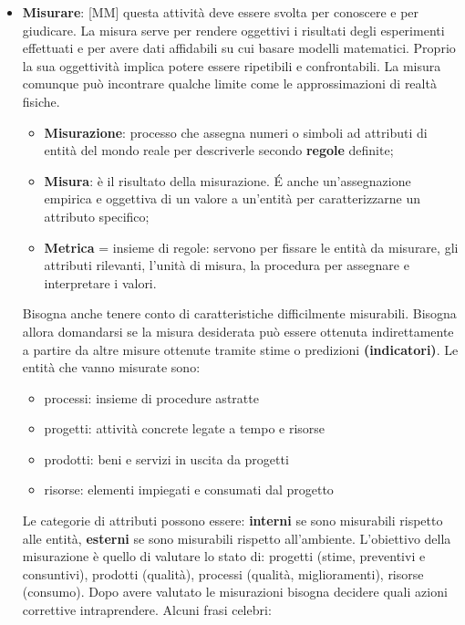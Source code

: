 \begin{itemize}
	\item \textbf{Misurare}: [MM] questa attività deve essere svolta per conoscere e per giudicare. La misura serve per rendere oggettivi i risultati degli esperimenti effettuati e per avere dati affidabili su cui basare modelli matematici. Proprio la sua oggettività implica potere essere ripetibili e confrontabili. La misura comunque può incontrare qualche limite come le approssimazioni di realtà fisiche.
		\begin{itemize}
			\item \textbf{Misurazione}: processo che assegna numeri o simboli ad attributi di entità del mondo reale per descriverle secondo \textbf{regole} definite;
			\item \textbf{Misura}: è il risultato della misurazione. \'E anche un'assegnazione empirica e oggettiva di un valore a un'entità per caratterizzarne un attributo specifico;
			\item \textbf{Metrica} = insieme di regole: servono per fissare le entità da misurare, gli attributi rilevanti, l'unità di misura, la procedura per assegnare e interpretare i valori.
		\end{itemize}
		\noindent
		Bisogna anche tenere conto di caratteristiche difficilmente misurabili. Bisogna allora domandarsi se la misura desiderata può essere ottenuta indirettamente a partire da altre misure ottenute tramite stime o predizioni \textbf{(indicatori)}. \newline
		Le entità che vanno misurate sono:
			\begin{itemize}
				\item processi: insieme di procedure astratte
				\item progetti: attività concrete legate a tempo e risorse
				\item prodotti: beni e servizi in uscita da progetti
				\item risorse: elementi impiegati e consumati dal progetto
			\end{itemize}
			\noindent
		Le categorie di attributi possono essere: \textbf{interni} se sono misurabili rispetto alle entità, \textbf{esterni} se sono misurabili rispetto all'ambiente. L'obiettivo della misurazione è quello di valutare lo stato di: progetti (stime, preventivi e consuntivi), prodotti (qualità), processi (qualità, miglioramenti), risorse (consumo).
		Dopo avere valutato le misurazioni bisogna decidere quali azioni correttive intraprendere. \newline
		Alcuni frasi celebri:
			\begin{itemize}

\end{itemize}
\end{itemize}
